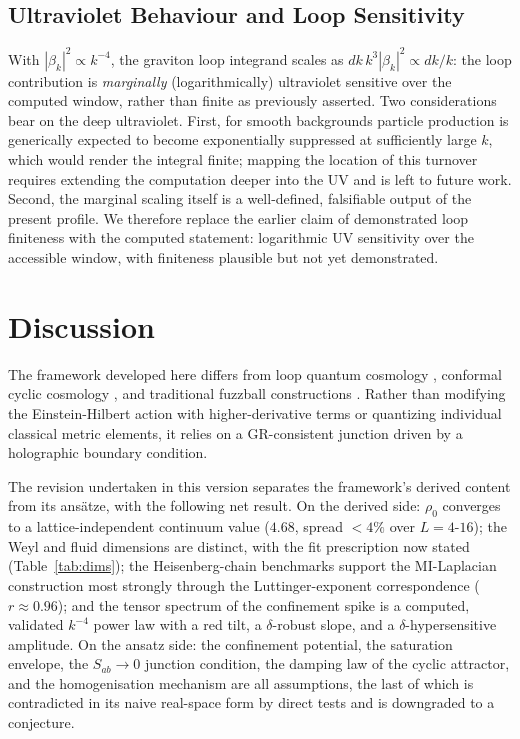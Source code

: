 \documentclass[reprint,superscriptaddress,amsmath,amssymb,aps,prd,showkeys,nofootinbib]{revtex4-2}
\begin{document}
\subsection{Ultraviolet Behaviour and Loop Sensitivity}

With $|\beta_k|^2\propto k^{-4}$, the graviton loop integrand scales as
$dk\,k^3|\beta_k|^2\propto dk/k$: the loop contribution is \emph{marginally}
(logarithmically) ultraviolet sensitive over the computed window, rather than finite as
previously asserted. Two considerations bear on the deep ultraviolet. First, for smooth
backgrounds particle production is generically expected to become exponentially suppressed
at sufficiently large $k$, which would render the integral finite; mapping the location of
this turnover requires extending the computation deeper into the UV and is left to future
work. Second, the marginal scaling itself is a well-defined, falsifiable output of the
present profile. We therefore replace the earlier claim of demonstrated loop finiteness
with the computed statement: logarithmic UV sensitivity over the accessible window, with
finiteness plausible but not yet demonstrated.

\section{Discussion}

The framework developed here differs from loop quantum cosmology \cite{AshtekarBojowald2006},
conformal cyclic cosmology \cite{PenroseBook}, and traditional fuzzball constructions
\cite{Susskind1995}. Rather than modifying the Einstein-Hilbert action with
higher-derivative terms or quantizing individual classical metric elements, it relies on a
GR-consistent junction driven by a holographic boundary condition.

The revision undertaken in this version separates the framework's derived content from its
ans\"atze, with the following net result. On the derived side: $\rho_0$ converges to a
lattice-independent continuum value ($4.68$, spread $<4\%$ over $L=4$-$16$); the Weyl and
fluid dimensions are distinct, with the fit prescription now stated (Table~\ref{tab:dims});
the Heisenberg-chain benchmarks support the MI-Laplacian construction most strongly through
the Luttinger-exponent correspondence ($r\approx0.96$); and the tensor spectrum of the
confinement spike is a computed, validated $k^{-4}$ power law with a red tilt, a
$\delta$-robust slope, and a $\delta$-hypersensitive amplitude. On the ansatz side: the
confinement potential, the saturation envelope, the $S_{ab}\to0$ junction condition, the
damping law of the cyclic attractor, and the homogenisation mechanism are all assumptions,
the last of which is contradicted in its naive real-space form by direct tests and is
downgraded to a conjecture.
\end{document}
